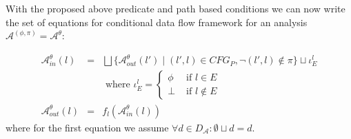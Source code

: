 

With the proposed above predicate and path based conditions we can now write the set of equations for conditional data flow framework for an analysis $\mathcal{A}^{(\phi,\pi)}=\mathcal{A}^\theta$:

\begin{eqnarray*}
\mathcal{A}_{in}^{\theta}(l) &= &\bigsqcup\{\mathcal{A}_{out}^{\theta}(l') \;|\; (l',l)\in CFG_P, \neg(l',l) \not\in\pi\}\sqcup \iota_E^l\\
 &  & \text{ where } \iota_E^l = \left\{ \begin{array}{rl}
 \phi &\mbox{ if $l\in E$} \\
  \bot &\mbox{ if $l\not\in E$}
       \end{array}\right. \\
\mathcal{A}_{out}^{\theta}(l) & = & f_l(\mathcal{A}_{in}^{\theta}(l))     
\end{eqnarray*}
where for the first equation we assume $\forall d\in D_{\mathcal{A}} : \emptyset\sqcup d =  d$.

